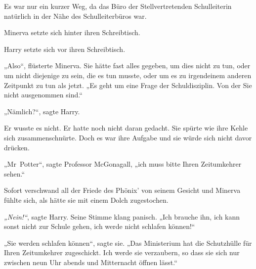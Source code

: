 Es war nur ein kurzer Weg, da das Büro der Stellvertretenden Schulleiterin natürlich in der Nähe des Schulleiterbüros war. 

Minerva setzte sich hinter ihren Schreibtisch. 

Harry setzte sich vor ihren Schreibtisch. 

„Also“, flüsterte Minerva. Sie hätte fast alles gegeben, um dies nicht zu tun, oder um nicht diejenige zu sein, die es tun musste, oder um es zu irgendeinem anderen Zeitpunkt zu tun als jetzt. „Es geht um eine Frage der Schuldisziplin. Von der Sie nicht ausgenommen sind.“ 

„Nämlich?“, sagte Harry. 

Er wusste es nicht. Er hatte noch nicht daran gedacht. Sie spürte wie ihre Kehle sich zusammenschnürte. Doch es war ihre Aufgabe und sie würde sich nicht davor drücken. 

„Mr~Potter“, sagte Professor McGonagall, „ich muss bitte Ihren Zeitumkehrer sehen.“ 

Sofort verschwand all der Friede des Phönix’ von seinem Gesicht und Minerva fühlte sich, als hätte sie mit einem Dolch zugestochen. 

\emph{„Nein!“}, sagte Harry. Seine Stimme klang panisch. „Ich brauche ihn, ich kann sonst nicht zur Schule gehen, ich werde nicht schlafen können!“ 

„Sie werden schlafen können“, sagte sie. „Das Ministerium hat die Schutzhülle für Ihren Zeitumkehrer zugeschickt. Ich werde sie verzaubern, so dass sie sich nur zwischen neun Uhr abends und Mitternacht öffnen lässt.“ 

